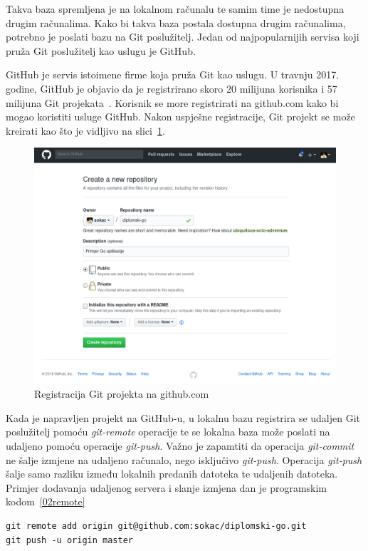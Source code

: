 Takva baza spremljena je na lokalnom računalu te samim time je nedostupna drugim računalima. Kako bi
takva baza postala dostupna drugim računalima, potrebno je poslati bazu na Git poslužitelj. Jedan
od najpopularnijih servisa koji pruža Git poslužitelj kao uslugu je GitHub.

GitHub je servis istoimene firme koja pruža Git kao uslugu. U travnju 2017. godine, GitHub je
objavio da je registrirano skoro 20 milijuna korisnika i 57 milijuna Git
projekata~\citep{github2017}. Korisnik se more registrirati na github.com kako bi mogao koristiti
usluge GitHub. Nakon uspješne registracije, Git projekt se može kreirati kao što je vidljivo na
slici~\ref{fig:02hgreg}.

\begin{figure}[h]
    \centering
    \includegraphics[width=0.7\linewidth]{img/02/gh.png}
    \caption{Registracija Git projekta na github.com}%
    \label{fig:02hgreg}
\end{figure}

Kada je napravljen projekt na GitHub-u, u lokalnu bazu registrira se udaljen Git poslužitelj pomoću
\textit{git-remote} operacije te se lokalna baza može poslati na udaljeno pomoću operacije
\textit{git-push}. Važno je zapamtiti da operacija \textit{git-commit} ne šalje izmjene na udaljeno
računalo, nego isključivo \textit{git-push}.  Operacija \textit{git-push} šalje samo razliku između
lokalnih predanih datoteka te udaljenih datoteka.  Primjer dodavanja udaljenog servera i slanje
izmjena dan je programskim kodom~\ref{02remote}

\begin{minipage}{\linewidth}
\begin{lstlisting}
git remote add origin git@github.com:sokac/diplomski-go.git
git push -u origin master
\end{lstlisting}
\end{minipage}

